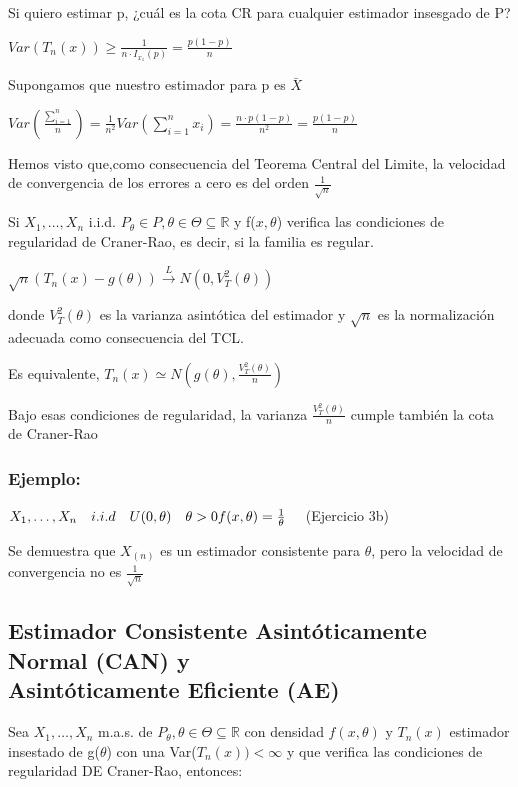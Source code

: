 Si quiero estimar p, ¿cuál es la cota CR para cualquier estimador insesgado de P?

\(
Var(T_n(x)) \geq \frac{1}{n \cdot I_{x_1}(p)}=\frac{p(1-p)}{n}
\)

Supongamos que nuestro estimador para p es $\bar{X}$

$Var(\frac{\sum_{i=1}^{n}}{n})=\frac{1}{n^2}Var(\sum_{i=1}^{n} x_i)
    =\frac{n \cdot p(1-p)}{n^2}=\frac{p(1-p)}{n}$

Hemos visto que,como consecuencia del Teorema Central del Limite,  la velocidad de convergencia de los errores a cero es del orden $\frac{1}{\sqrt{n}}$

Si $X_1,\dots,X_n$ i.i.d. $P_\theta \in P,\theta \in \Theta \subseteq \mathbb{R}$ y f($x,\theta$)
verifica las condiciones de regularidad de Craner-Rao, es decir, si la familia es regular.

$\sqrt{n}(T_n(x)-g(\theta)) \xrightarrow{L} N(0,V_T^2(\theta))$

donde $V_T^2(\theta)$ es la varianza asintótica del estimador y $\sqrt{n}$ es la normalización
adecuada como consecuencia del TCL.

Es equivalente, $T_n(x) \simeq N(g(\theta),\frac{V_T^2(\theta)}{n})$

Bajo esas condiciones de regularidad, la varianza $\frac{V_T^2(\theta)}{n}$
cumple también la cota de Craner-Rao

\subsubsection*{Ejemplo:}

\(
X_1,\dots,X_n \quad i.i.d \quad U(0,\theta) \quad \theta>0
\\f(x,\theta)= \frac{1}{\theta} \quad
\)
(Ejercicio 3b)

Se demuestra que $X_{(n)}$ es un estimador consistente para $\theta$, pero la velocidad de convergencia no es $\frac{1}{\sqrt{n}}$

\subsection{Estimador Consistente Asintóticamente Normal (CAN) y \texorpdfstring{\\}{ } Asintóticamente Eficiente (AE)}

Sea $X_1,\dots,X_n$ m.a.s. de $P_\theta, \theta \in \Theta \subseteq \mathbb{R}$
con densidad $f(x,\theta)$ y $T_n(x)$ estimador insestado de g($\theta$) con una Var($T_n(x))<\infty$
y que verifica las condiciones de regularidad DE Craner-Rao, entonces:


